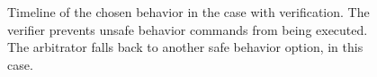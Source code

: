 %
%

\begin{figure}[!t]
  \centering
  
  \caption{
      Timeline of the chosen behavior in the case with verification.
      The verifier prevents unsafe behavior commands from being executed.
      The arbitrator falls back to another safe behavior option,
       in this case.
  }
  \label{fig:experiments-safe-timeline}
\end{figure}